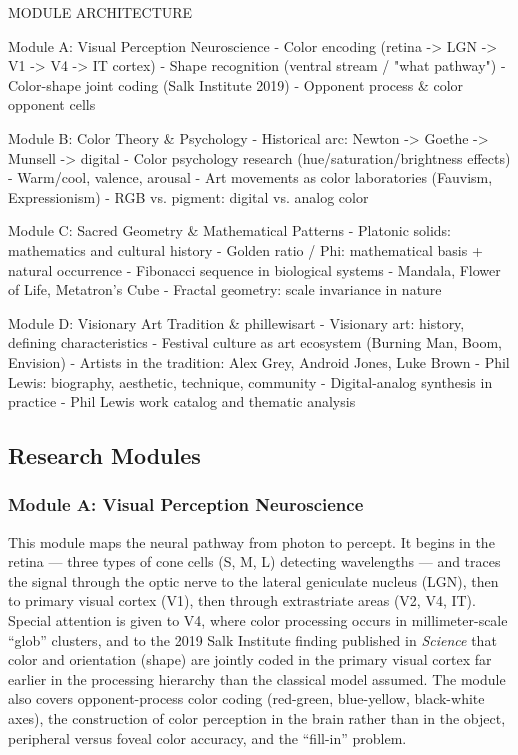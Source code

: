 \documentclass[11pt,letterpaper]{article}
\begin{document}
\begin{asciibox}
MODULE ARCHITECTURE

Module A: Visual Perception Neuroscience
  - Color encoding (retina -> LGN -> V1 -> V4 -> IT cortex)
  - Shape recognition (ventral stream / "what pathway")
  - Color-shape joint coding (Salk Institute 2019)
  - Opponent process \& color opponent cells

Module B: Color Theory \& Psychology
  - Historical arc: Newton -> Goethe -> Munsell -> digital
  - Color psychology research (hue/saturation/brightness effects)
  - Warm/cool, valence, arousal
  - Art movements as color laboratories (Fauvism, Expressionism)
  - RGB vs. pigment: digital vs. analog color

Module C: Sacred Geometry \& Mathematical Patterns
  - Platonic solids: mathematics and cultural history
  - Golden ratio / Phi: mathematical basis + natural occurrence
  - Fibonacci sequence in biological systems
  - Mandala, Flower of Life, Metatron's Cube
  - Fractal geometry: scale invariance in nature

Module D: Visionary Art Tradition \& phillewisart
  - Visionary art: history, defining characteristics
  - Festival culture as art ecosystem (Burning Man, Boom, Envision)
  - Artists in the tradition: Alex Grey, Android Jones, Luke Brown
  - Phil Lewis: biography, aesthetic, technique, community
  - Digital-analog synthesis in practice
  - Phil Lewis work catalog and thematic analysis
\end{asciibox}

\subsection{Research Modules}

\subsubsection{Module A: Visual Perception Neuroscience}

This module maps the neural pathway from photon to percept. It begins in the retina --- three types of cone cells (S, M, L) detecting wavelengths --- and traces the signal through the optic nerve to the lateral geniculate nucleus (LGN), then to primary visual cortex (V1), then through extrastriate areas (V2, V4, IT). Special attention is given to V4, where color processing occurs in millimeter-scale ``glob'' clusters, and to the 2019 Salk Institute finding published in \textit{Science} that color and orientation (shape) are jointly coded in the primary visual cortex far earlier in the processing hierarchy than the classical model assumed. The module also covers opponent-process color coding (red-green, blue-yellow, black-white axes), the construction of color perception in the brain rather than in the object, peripheral versus foveal color accuracy, and the ``fill-in'' problem.
\end{document}
